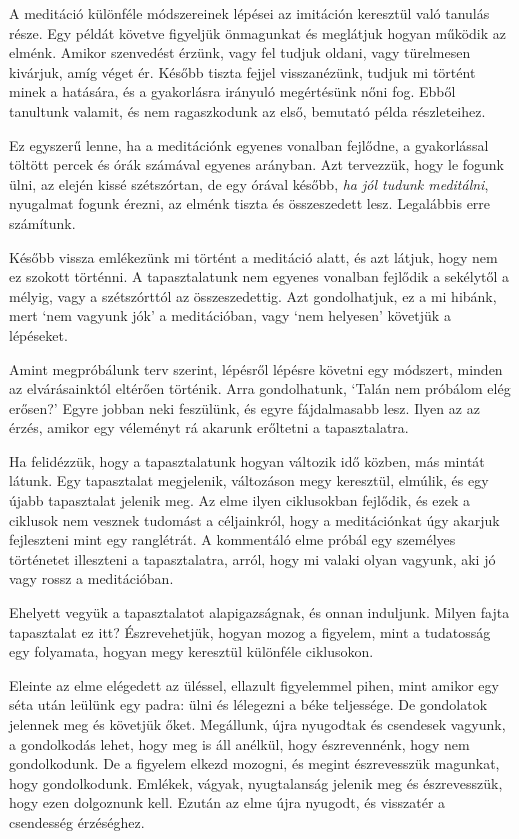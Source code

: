 A meditáció különféle módszereinek lépései az imitáción keresztül való
tanulás része. Egy példát követve figyeljük önmagunkat és meglátjuk
hogyan működik az elménk. Amikor szenvedést érzünk, vagy fel tudjuk
oldani, vagy türelmesen kivárjuk, amíg véget ér. Később tiszta fejjel
visszanézünk, tudjuk mi történt minek a hatására, és a gyakorlásra
irányuló megértésünk nőni fog. Ebből tanultunk valamit, és nem
ragaszkodunk az első, bemutató példa részleteihez.


Ez egyszerű lenne, ha a meditációnk egyenes vonalban fejlődne, a
gyakorlással töltött percek és órák számával egyenes arányban. Azt
tervezzük, hogy le fogunk ülni, az elején kissé szétszórtan, de egy
órával később, \emph{ha jól tudunk meditálni}, nyugalmat fogunk érezni,
az elménk tiszta és összeszedett lesz. Legalábbis erre számítunk.

Később vissza emlékezünk mi történt a meditáció alatt, és azt látjuk,
hogy nem ez szokott történni. A tapasztalatunk nem egyenes vonalban
fejlődik a sekélytől a mélyig, vagy a szétszórttól az összeszedettig.
Azt gondolhatjuk, ez a mi hibánk, mert `nem vagyunk jók' a meditációban,
vagy `nem helyesen' követjük a lépéseket.

Amint megpróbálunk terv szerint, lépésről lépésre követni egy módszert,
minden az elvárásainktól eltérően történik. Arra gondolhatunk, `Talán
nem próbálom elég erősen?' Egyre jobban neki feszülünk, és egyre
fájdalmasabb lesz. Ilyen az az érzés, amikor egy véleményt rá akarunk
erőltetni a tapasztalatra.

Ha felidézzük, hogy a tapasztalatunk hogyan változik idő közben, más
mintát látunk. Egy tapasztalat megjelenik, változáson megy keresztül,
elmúlik, és egy újabb tapasztalat jelenik meg. Az elme ilyen ciklusokban
fejlődik, és ezek a ciklusok nem vesznek tudomást a céljainkról, hogy a
meditációnkat úgy akarjuk fejleszteni mint egy ranglétrát. A kommentáló
elme próbál egy személyes történetet illeszteni a tapasztalatra, arról,
hogy mi valaki olyan vagyunk, aki jó vagy rossz a meditációban.

Ehelyett vegyük a tapasztalatot alapigazságnak, és onnan induljunk.
Milyen fajta tapasztalat ez itt? Észrevehetjük, hogyan mozog a figyelem,
mint a tudatosság egy folyamata, hogyan megy keresztül különféle
ciklusokon.

Eleinte az elme elégedett az üléssel, ellazult figyelemmel pihen, mint
amikor egy séta után leülünk egy padra: ülni és lélegezni a béke
teljessége. De gondolatok jelennek meg és követjük őket. Megállunk, újra
nyugodtak és csendesek vagyunk, a gondolkodás lehet, hogy meg is áll
anélkül, hogy észrevennénk, hogy nem gondolkodunk. De a figyelem elkezd
mozogni, és megint észrevesszük magunkat, hogy gondolkodunk. Emlékek,
vágyak, nyugtalanság jelenik meg és észrevesszük, hogy ezen dolgoznunk
kell. Ezután az elme újra nyugodt, és visszatér a csendesség érzéséghez.

